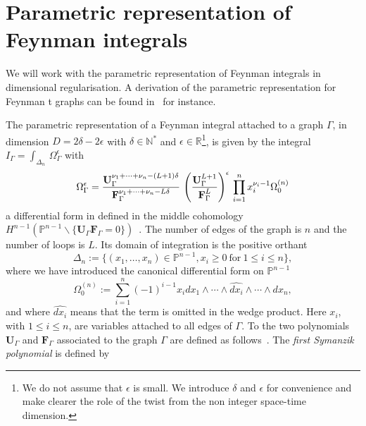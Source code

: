 \documentclass[a4paper,12pt]{article}
\numberwithin{equation}{section}
\numberwithin{figure}{section}
\begin{document}
\section{Parametric representation of Feynman integrals}
\label{sec:parametric}

We will work with the parametric representation of Feynman
integrals in  dimensional
regularisation. A derivation of the parametric representation for Feynman t
graphs can be found in~\cite{nakanishi1971graph,Vanhove:2014wqa,Bogner:2010kv,Weinzierl:2022eaz} for instance. 

The parametric representation of a Feynman integral attached to a
graph $\Gamma$, in dimension $D=2\delta-2\epsilon$ with $\delta\in\mathbb N^*$ and
$\epsilon\in\mathbb R$\footnote{We do not assume that $\epsilon$ is
	small. We introduce $\delta$ and $\epsilon$ for convenience and make
	clearer the role of the twist from the non integer space-time dimension.}, is given by the integral $  I_\Gamma = \int_{\Delta_n}
\, \Omega^\epsilon_\Gamma$ with 
\begin{equation}\label{e:FeynPara}
  \Omega^\epsilon_\Gamma = { \textbf{U}_\Gamma ^{\nu_1+\cdots+\nu_n-(L+1)\delta}  \over \textbf{F}_\Gamma ^{\nu_1+\cdots+\nu_n-L\delta} }\,
  \left(\textbf{U}_\Gamma^{L+1}\over \textbf{F}_\Gamma^{L}\right)^{\epsilon} \, \prod_{i=1}^n x_i^{\nu_i-1} \Omega^{(n)}_0
\end{equation}
a differential form in defined in the middle cohomology $H^{n-1}(\mathbb P^{n-1}\backslash
\{\textbf{U}_\Gamma \textbf{F}_\Gamma=0\})$~\cite{bek,Brown:2009ta}.
The number of edges of the graph is $n$ and the number of loops is
 $L$.
Its domain of integration is the positive orthant
\begin{equation}\label{e:Deltan}
	\Delta_n:=\{(x_1,\dots,x_n)\in \mathbb P^{n-1}, x_i \geq0 ~\textrm{for}~ 1\leq
	i\leq n\},
\end{equation}
where we have introduced the  canonical differential form on
$\mathbb P^{n-1}$ 
% 
\begin{equation}
	\Omega_0^{(n)}:=  \sum_{i=1}^n (-1)^{i-1} x_i dx_1\wedge \cdots \wedge \widehat{dx_i} \wedge\cdots \wedge dx_n ,
\end{equation}
and where  $\widehat{dx_i}$ means that the term is omitted in the wedge
product.
Here  $x_i$, with $1\leq i\leq n$,  are  variables attached to all edges of
$\Gamma$.
%
To the two polynomials $\textbf{U}_\Gamma$ and $\textbf{F}_\Gamma$
associated to the graph $\Gamma$ are defined as
follows~\cite{nakanishi1971graph,Bogner:2010kv,Weinzierl:2022eaz}.  The {\em first
Symanzik polynomial} is defined by
\end{document}
